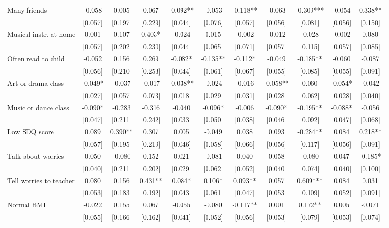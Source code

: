 \documentclass[12pt]{article}
\begin{document}
\begin{table}[ht]
\begin{center}
\begin{adjustbox}{width=1.2\textwidth,center=\textwidth}
\begin{tabular}{l*{10}{c}}
Many friends  & -0.058 & 0.005 & 0.067 & -0.092** & -0.053 & -0.118** & -0.063 & -0.309*** & -0.054 & 0.338** \\
 & [0.057] & [0.197] & [0.229] & [0.044] & [0.076] & [0.057] & [0.056] & [0.081] & [0.056] & [0.150] \\
Musical instr. at home & 0.001 & 0.107 & 0.403* & -0.024 & 0.015 & -0.002 & -0.012 & -0.028 & -0.002 & 0.080 \\
 & [0.057] & [0.202] & [0.230] & [0.044] & [0.065] & [0.071] & [0.057] & [0.115] & [0.057] & [0.085] \\
Often read to child & -0.052 & 0.156 & 0.269 & -0.082* & -0.135** & -0.112* & -0.049 & -0.185** & -0.060 & -0.087 \\
 & [0.056] & [0.210] & [0.253] & [0.044] & [0.061] & [0.067] & [0.055] & [0.085] & [0.055] & [0.091] \\
Art or drama class  & -0.049* & -0.037 & -0.017 & -0.038** & -0.024 & -0.016 & -0.058** & 0.060 & -0.054* & -0.042 \\
 & [0.027] & [0.057] & [0.073] & [0.018] & [0.029] & [0.031] & [0.028] & [0.062] & [0.028] & [0.040] \\
Music or dance class  & -0.090* & -0.283 & -0.316 & -0.040 & -0.096* & -0.006 & -0.090* & -0.195** & -0.088* & -0.056 \\
 & [0.047] & [0.211] & [0.242] & [0.033] & [0.050] & [0.038] & [0.046] & [0.092] & [0.047] & [0.068] \\
Low SDQ score  & 0.089 & 0.390** & 0.307 & 0.005 & -0.049 & 0.038 & 0.093 & -0.284** & 0.084 & 0.218** \\
 & [0.057] & [0.195] & [0.219] & [0.046] & [0.058] & [0.066] & [0.056] & [0.117] & [0.056] & [0.091] \\
Talk about worries  & 0.050 & -0.080 & 0.152 & 0.021 & -0.081 & 0.040 & 0.058 & -0.080 & 0.047 & -0.185* \\
 & [0.040] & [0.211] & [0.202] & [0.029] & [0.062] & [0.052] & [0.040] & [0.074] & [0.040] & [0.100] \\
Tell worries to teacher & 0.080 & 0.156 & 0.431** & 0.084* & 0.106* & 0.093** & 0.057 & 0.609*** & 0.084 & 0.031 \\
 & [0.053] & [0.183] & [0.192] & [0.043] & [0.061] & [0.047] & [0.053] & [0.109] & [0.052] & [0.091] \\
Normal BMI & -0.022 & 0.155 & 0.067 & -0.055 & -0.080 & -0.117** & 0.001 & 0.172** & 0.005 & -0.071 \\
 & [0.055] & [0.166] & [0.162] & [0.041] & [0.052] & [0.056] & [0.053] & [0.079] & [0.053] & [0.074] \\

\end{tabular}
\end{adjustbox}
\end{center}
\end{table}
\end{document}
